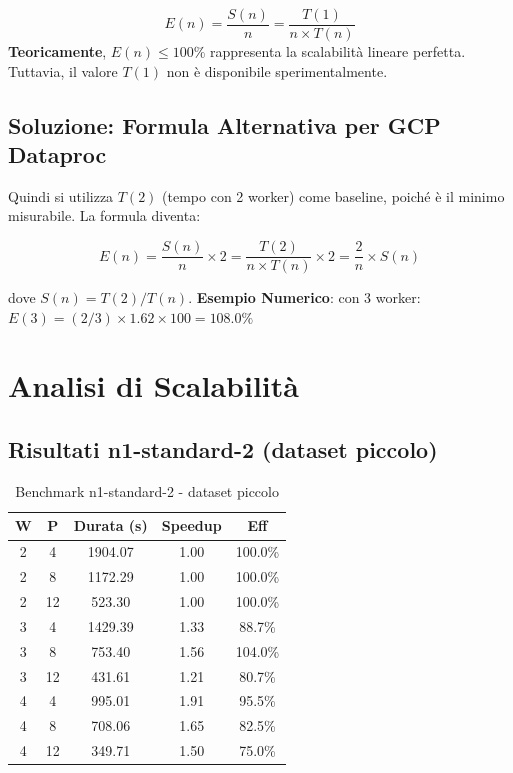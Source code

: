 \documentclass[8pt,a4paper]{article}
\begin{document}
\begin{equation}
E(n) = \frac{S(n)}{n} = \frac{T(1)}{n \times T(n)}
\end{equation}
\noindent
\textbf{Teoricamente}, $E(n) \leq 100\%$ rappresenta la scalabilità lineare perfetta. Tuttavia, il valore $T(1)$ non è disponibile sperimentalmente.

\subsection{Soluzione: Formula Alternativa per GCP Dataproc}

Quindi si utilizza $T(2)$ (tempo con 2 worker) come baseline, poiché è il minimo misurabile. La formula diventa:

\begin{equation}
E(n) = \frac{S(n)}{n} \times 2 = \frac{T(2)}{n \times T(n)} \times 2 = \frac{2}{n} \times S(n)
\end{equation}

dove $S(n) = T(2) / T(n)$.
\textbf{Esempio Numerico}: con 3 worker: $E(3) = (2/3) \times 1.62 \times 100 = 108.0\%$

\section{Analisi di Scalabilità}

\subsection{Risultati n1-standard-2 (dataset piccolo)}

\begin{table}[H]
\centering
\caption{Benchmark n1-standard-2 - dataset piccolo}
\label{tab:n1_results}
\footnotesize
\begin{tabular}{|c|c|c|c|c|}
\hline
\textbf{W} & \textbf{P} & \textbf{Durata (s)} & \textbf{Speedup} & \textbf{Eff} \\
\hline
2 & 4 & 1904.07 & 1.00 & 100.0\% \\
2 & 8 & 1172.29 & 1.00 & 100.0\% \\
2 & 12 & 523.30 & 1.00 & 100.0\% \\
\hline
3 & 4 & 1429.39 & 1.33 & 88.7\% \\
3 & 8 & 753.40 & 1.56 & 104.0\% \\
3 & 12 & 431.61 & 1.21 & 80.7\% \\
\hline
4 & 4 & 995.01 & 1.91 & 95.5\% \\
4 & 8 & 708.06 & 1.65 & 82.5\% \\
4 & 12 & 349.71 & 1.50 & 75.0\% \\
\hline
\end{tabular}
\end{table}
\end{document}
